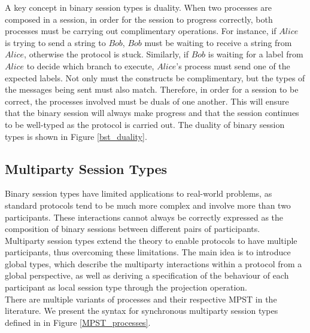 \documentclass[12pt,twoside]{report}
\begin{document}
A key concept in binary session types is duality. When two processes are composed in a session, in order for the session to progress correctly, both processes must be carrying out complimentary operations. For instance, if $\textit{Alice}$ is trying to send a string to $\textit{Bob}$, $\textit{Bob}$ must be waiting to receive a string from $\textit{Alice}$, otherwise the protocol is stuck. Similarly, if $\textit{Bob}$ is waiting for a label from $\textit{Alice}$ to decide which branch to execute, $\textit{Alice}$'s process must send one of the expected labels. Not only must the constructs be complimentary, but the types of the messages being sent must also match. Therefore, in order for a session to be correct, the processes involved must be duals of one another. This will ensure that the binary session will always make progress and that the session continues to be well-typed as the protocol is carried out. The duality of binary session types is shown in Figure \ref{bst_duality}.



\subsection{Multiparty Session Types}\label{multiparty-session-types}
Binary session types have limited applications to real-world problems, as standard protocols tend to be much more complex and involve more than two participants. These interactions cannot always be correctly expressed as the composition of binary sessions between different pairs of participants. \\

Multiparty session types\cite{asyncmpst2} extend the theory to enable protocols to have multiple participants, thus overcoming these limitations. The main idea is to introduce global types, which describe the multiparty interactions within a protocol from a global perspective, as well as deriving a specification of the behaviour of each participant as local session type through the projection operation. \\

There are multiple variants of processes and their respective MPST in the literature. We present the syntax for synchronous multiparty session types defined in \cite{verygentleintrotompst} in Figure \ref{MPST_processes}.
\end{document}
